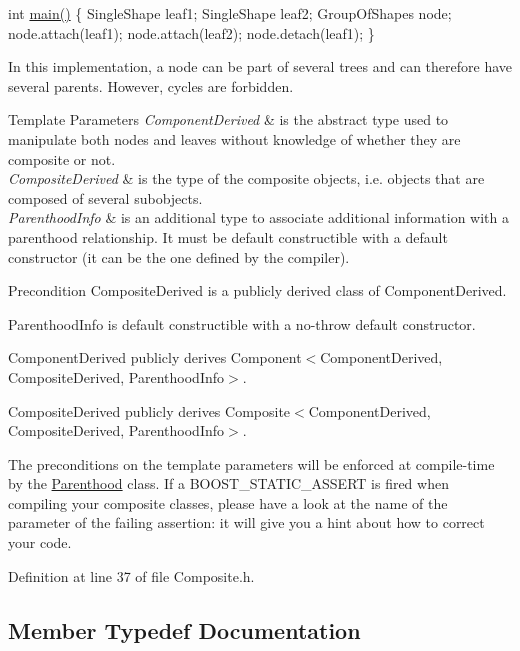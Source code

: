 int \hyperlink{main_8cpp_a3c04138a5bfe5d72780bb7e82a18e627}{main()} \{ Single\+Shape leaf1; Single\+Shape leaf2; Group\+Of\+Shapes node; node.\+attach(leaf1); node.\+attach(leaf2); node.\+detach(leaf1); \} 

In this implementation, a node can be part of several trees and can therefore have several parents. However, cycles are forbidden.


\begin{DoxyTemplParams}{Template Parameters}
{\em Component\+Derived} & is the abstract type used to manipulate both nodes and leaves without knowledge of whether they are composite or not. \\
\hline
{\em Composite\+Derived} & is the type of the composite objects, i.\+e. objects that are composed of several subobjects. \\
\hline
{\em Parenthood\+Info} & is an additional type to associate additional information with a parenthood relationship. It must be default constructible with a default constructor (it can be the one defined by the compiler).\\
\hline
\end{DoxyTemplParams}
\begin{DoxyPrecond}{Precondition}
Composite\+Derived is a publicly derived class of Component\+Derived. 

Parenthood\+Info is default constructible with a no-\/throw default constructor. 

Component\+Derived publicly derives Component$<$\+Component\+Derived, Composite\+Derived, Parenthood\+Info$>$. 

Composite\+Derived publicly derives Composite$<$\+Component\+Derived, Composite\+Derived, Parenthood\+Info$>$.
\end{DoxyPrecond}
The preconditions on the template parameters will be enforced at compile-\/time by the \hyperlink{classocra_1_1Parenthood}{Parenthood} class. If a B\+O\+O\+S\+T\+\_\+\+S\+T\+A\+T\+I\+C\+\_\+\+A\+S\+S\+E\+RT is fired when compiling your composite classes, please have a look at the name of the parameter of the failing assertion\+: it will give you a hint about how to correct your code. 

Definition at line 37 of file Composite.\+h.



\subsection{Member Typedef Documentation}
\hypertarget{classocra_1_1Component_aecb250aaac3aad8d82ba30303b10cf2a}{}\label{classocra_1_1Component_aecb250aaac3aad8d82ba30303b10cf2a} 
